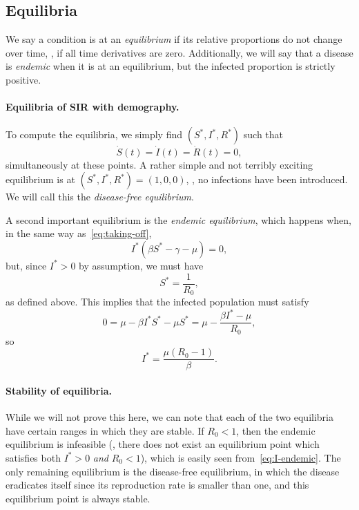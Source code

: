 \documentclass[12pt]{article}
\begin{document}
\subsection{Equilibria}
We say a condition is at an \emph{equilibrium} if its relative proportions do not change
over time, \ie, if all time derivatives are zero. Additionally, we will say that
a disease is \emph{endemic} when it is at an equilibrium, but the infected
proportion is strictly positive.

\paragraph{Equilibria of SIR with demography.} To compute the equilibria,
we simply find $(S^*, I^*, R^*)$ such that
\[
    \dot S(t) = \dot I(t) = \dot R(t) = 0,
\]
simultaneously at these points. A rather simple and not terribly exciting
equilibrium is at $(S^*, I^*, R^*) = (1, 0, 0)$, \ie, no infections have
been introduced. We will call this the \emph{disease-free equilibrium}.

A second important equilibrium is the \emph{endemic equilibrium}, which happens
when, in the same way as~\eqref{eq:taking-off},
\[
    I^*(\beta S^* - \gamma - \mu) = 0,
\]
but, since $I^* > 0$ by assumption, we must have
\[
    S^* = \frac{1}{R_0},
\]
as defined above. This implies that the infected population must satisfy
\[
    0 = \mu - \beta I^*S^* - \mu S^* = \mu - \frac{\beta I^* - \mu}{R_0},
\]
so
\begin{equation}\label{eq:I-endemic}
    I^* = \frac{\mu(R_0 - 1)}{\beta}.
\end{equation}

\paragraph{Stability of equilibria.} While we will not prove this here, we can note that each of the two equilibria have certain ranges in which they are stable. If $R_0 < 1$, then the endemic equilibrium is infeasible (\ie, there does not exist an equilibrium point which satisfies both $I^* > 0$ \emph{and} $R_0 < 1$), which is easily seen from~\eqref{eq:I-endemic}. The only remaining equilibrium is the disease-free equilibrium, in which the disease eradicates itself since its reproduction rate is smaller than one, and this equilibrium point is always stable.
\end{document}
